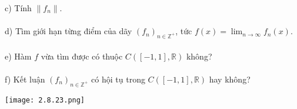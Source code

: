 \documentclass[10pt, a4paper]{article}
\begin{document}
\color{red}c) \color{black}Tính $\lVert f_n\rVert$.\\\\
\color{red}d) \color{black}Tìm giới hạn từng điểm của dãy $(f_n)_{n\in\mathbb Z^+}$, tức $f(x)=\displaystyle\lim_{n\rightarrow\infty}f_n(x)$.\\\\
\color{red}e) \color{black}Hàm $f$ vừa tìm được có thuộc $C([-1,1],\mathbb R)$ không?\\\\
\color{red}f) \color{black}Kết luận $(f_n)_{n\in\mathbb Z^+}$ có hội tụ trong $C([-1,1],\mathbb R)$ hay không?
\begin{center}
	\texttt{[image: 2.8.23.png]}
\end{center}

\newpage
\end{document}
